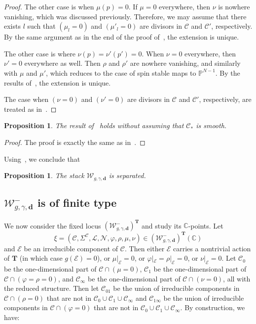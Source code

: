 \documentclass{amsart}
\newtheorem{prop}[thm]{Proposition}
\theoremstyle{definition}
\theoremstyle{remark}
\theoremstyle{plain}
\theoremstyle{definition}
\theoremstyle{remark}
\newcommand{\C}{\mathbb{C}}
\newcommand{\T}{\mathbf{T}}
\renewcommand{\P}{\mathbb{P}}
\newcommand{\mc}[1]{\mathcal{#1}}
\newcommand{\mbf}[1]{\mathbf{#1}}
\newcommand{\1}{\mathbf{1}}
\newcommand{\2}{\mathbf{2}}
\newcommand{\3}{\mathbf{3}}
\begin{document}
\begin{proof}
    The other case is when $\mu(p) = 0$. If $\mu = 0$ everywhere, then $\nu$ is nowhere vanishing, which was discussed previously. Therefore, we may assume that there exists $l$ such that $(\mu_{l} = 0)$ and $(\mu'_{l} = 0)$ are divisors in $\mc{C}$ and $\mc{C'}$, respectively. By the same argument as in the end of the proof of~\cite[Lemma 4.1]{mspfermat}, the extension is unique.

    The other case is where $\nu(p) = \nu'(p') = 0$. When $\nu = 0$ everywhere, then $\nu' = 0$ everywhere as well. Then $\rho$ and $\rho'$ are nowhere vanishing, and similarly with $\mu$ and $\mu'$, which reduces to the case of spin stable maps to $\P^{N-1}$. By the results of~\cite{spingw}, the extension is unique.

    The case when $(\nu = 0)$ and $(\nu' = 0)$ are divisors in $\mc{C}$ and $\mc{C'}$, respectively, are treated as in~\cite[Lemma 4.1]{mspfermat}.
\end{proof}

\begin{prop}
    The result of~ holds without assuming that $\mc{C}_*$ is smooth.
\end{prop}

\begin{proof}
    The proof is exactly the same as in~\cite[Proposition 4.4]{mspfermat}.
\end{proof}

Using~\cite[Theorem 7.8]{champs}, we conclude that

\begin{prop}\label{prop:separated}
    The stack $\mc{W}_{g,\gamma,\mbf{d}}$ is separated.
\end{prop}


\subsection{$\mc{W}^-_{g,\gamma,\mbf{d}}$ is of finite type}

We now consider the fixed locus $(\mc{W}^-_{g,\gamma,\mbf{d}})^{\T}$ and study its $\C$-points. Let
\[ \xi = (\mc{C}, \Sigma^{\mc{C}}, \mc{L}, \mc{N}, \varphi,\rho,\mu,\nu) \in (\mc{W}^-_{g,\gamma,\mbf{d}})^{\T}(\C) \]
and $\mc{E}$ be an irreducible component of $\mc{C}$. Then either $\mc{E}$ carries a nontrivial action of $\T$ (in which case $g(\mc{E}) = 0$), or $\mu|_{\mc{E}} = 0$, or $\varphi|_{\mc{E}} = \rho|_{\mc{E}} = 0$, or $\nu|_{\mc{E}} = 0$. Let $\mc{C}_0$ be the one-dimensional part of $\mc{C} \cap (\mu = 0)$, $\mc{C}_1$ be the one-dimensional part of $\mc{C} \cap (\varphi = \rho = 0)$, and $\mc{C}_{\infty}$ be the one-dimensional part of $\mc{C} \cap (\nu = 0)$, all with the reduced structure. Then let $\mc{C}_{01}$ be the union of irreducible components in $\mc{C} \cap (\rho = 0)$ that are not in $\mc{C}_0 \cup \mc{C}_1 \cup \mc{C}_{\infty}$ and $\mc{C}_{1\infty}$ be the union of irreducible components in $\mc{C} \cap (\varphi = 0)$ that are not in $\mc{C}_0 \cup \mc{C}_{1} \cup \mc{C}_{\infty}$. By construction, we have:
\end{document}
